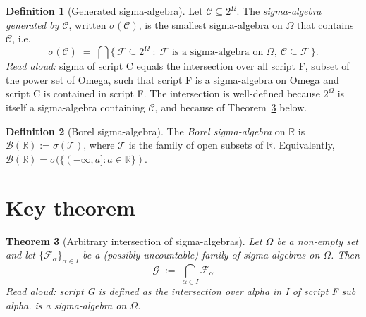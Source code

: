 \documentclass[11pt]{article}
\newtheorem{theorem}{Theorem}
\theoremstyle{definition}
\newtheorem{definition}[theorem]{Definition}
\begin{document}
\begin{definition}[Generated sigma-algebra]
Let $\mathcal{C} \subseteq 2^{\Omega}$. The \emph{sigma-algebra generated by $\mathcal{C}$}, written $\sigma(\mathcal{C})$, is the smallest sigma-algebra on $\Omega$ that contains $\mathcal{C}$, i.e.
\[
\sigma(\mathcal{C}) \;=\; \bigcap \bigl\{\, \mathcal{F} \subseteq 2^{\Omega} \;:\; \mathcal{F} \text{ is a sigma-algebra on } \Omega,\ \mathcal{C} \subseteq \mathcal{F} \,\bigr\}.
\]
\emph{Read aloud:} sigma of script C equals the intersection over all script F, subset of the power set of Omega, such that script F is a sigma-algebra on Omega and script C is contained in script F.
The intersection is well-defined because $2^{\Omega}$ is itself a sigma-algebra containing $\mathcal{C}$, and because of Theorem~\ref{thm:intersection} below.
\end{definition}

\begin{definition}[Borel sigma-algebra]
The \emph{Borel sigma-algebra} on $\mathbb{R}$ is $\mathcal{B}(\mathbb{R}) := \sigma(\mathcal{T})$, where $\mathcal{T}$ is the family of open subsets of $\mathbb{R}$. Equivalently, $\mathcal{B}(\mathbb{R}) = \sigma(\{(-\infty, a] : a \in \mathbb{R}\})$.
\end{definition}

\section{Key theorem}

\begin{theorem}[Arbitrary intersection of sigma-algebras]\label{thm:intersection}
Let $\Omega$ be a non-empty set and let $\{\mathcal{F}_{\alpha}\}_{\alpha \in I}$ be a (possibly uncountable) family of sigma-algebras on $\Omega$. Then
\[
\mathcal{G} \;:=\; \bigcap_{\alpha \in I} \mathcal{F}_{\alpha}
\]
\emph{Read aloud:} script G is defined as the intersection over alpha in I of script F sub alpha.
is a sigma-algebra on $\Omega$.
\end{theorem}
\end{document}
